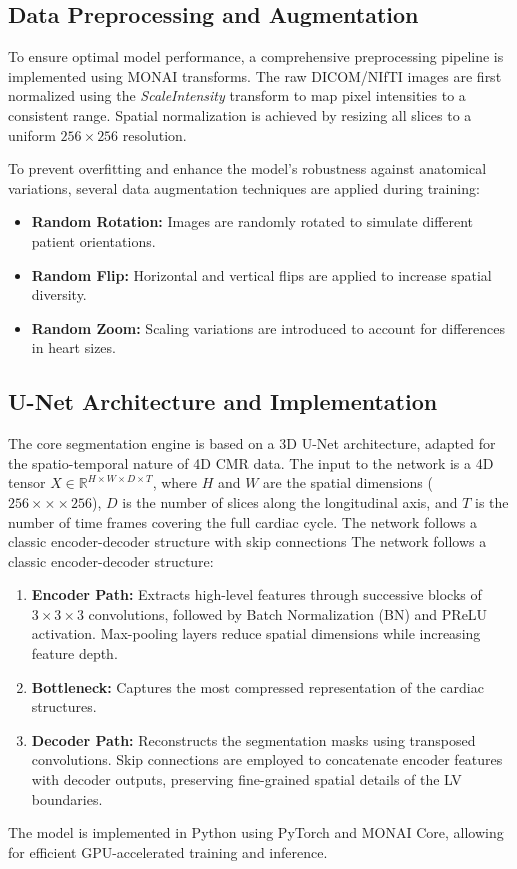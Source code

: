 \documentclass[final,3p,times,twocolumn]{elsarticle}
\begin{document}
\subsection{Data Preprocessing and Augmentation}
To ensure optimal model performance, a comprehensive preprocessing pipeline is implemented using MONAI transforms. The raw DICOM/NIfTI images are first normalized using the \textit{ScaleIntensity} transform to map pixel intensities to a consistent range. Spatial normalization is achieved by resizing all slices to a uniform $256 \times 256$ resolution. 

To prevent overfitting and enhance the model's robustness against anatomical variations, several data augmentation techniques are applied during training:
\begin{itemize}
    \item \textbf{Random Rotation:} Images are randomly rotated to simulate different patient orientations.
    \item \textbf{Random Flip:} Horizontal and vertical flips are applied to increase spatial diversity.
    \item \textbf{Random Zoom:} Scaling variations are introduced to account for differences in heart sizes.
\end{itemize}

\subsection{U-Net Architecture and Implementation}
The core segmentation engine is based on a 3D U-Net architecture, adapted for the spatio-temporal nature of 4D CMR data. The input to the network is a 4D tensor $X \in \mathbb{R}^{H \times W \times D \times T}$, where $H$ and $W$ are the spatial dimensions ($256 ×\times × 256$), $D$ is the number of slices along the longitudinal axis, and $T$ is the number of time frames covering the full cardiac cycle. The network follows a classic encoder-decoder structure with skip connections \cite{b1} The network follows a classic encoder-decoder structure:
\begin{enumerate}
    \item \textbf{Encoder Path:} Extracts high-level features through successive blocks of $3 \times 3 \times 3$ convolutions, followed by Batch Normalization (BN) and PReLU activation. Max-pooling layers reduce spatial dimensions while increasing feature depth.
    \item \textbf{Bottleneck:} Captures the most compressed representation of the cardiac structures.
    \item \textbf{Decoder Path:} Reconstructs the segmentation masks using transposed convolutions. Skip connections are employed to concatenate encoder features with decoder outputs, preserving fine-grained spatial details of the LV boundaries.
\end{enumerate}
The model is implemented in Python using PyTorch and MONAI Core, allowing for efficient GPU-accelerated training and inference.
\end{document}

